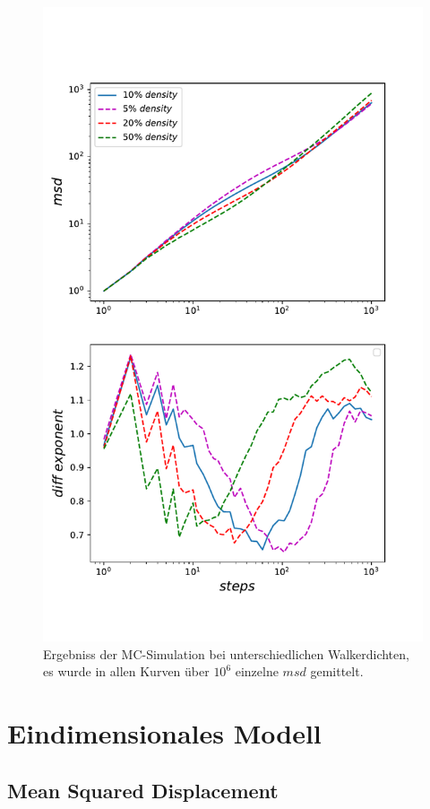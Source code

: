 \documentclass[a4paper, 12pt]{scrartcl}
\begin{document}
\begin{figure}[H]
	\centering
	\includegraphics[scale=0.8]{alldens.pdf}
	\caption{Ergebniss der MC-Simulation bei unterschiedlichen Walkerdichten, es wurde in allen Kurven über $10^6$ einzelne $msd$ gemittelt.}
\end{figure}

\newpage
\section{Eindimensionales Modell}

\subsection{Mean Squared Displacement}
\end{document}

